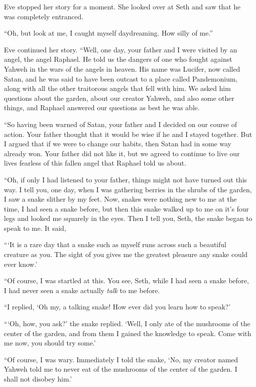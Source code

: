 \documentclass[12pt,twoside,titlepage]{report}
\begin{document}
Eve stopped her story for a moment. She looked over at Seth and saw that
he was completely entranced.

``Oh, but look at me, I caught myself daydreaming. How silly of me.''

Eve continued her story. ``Well, one day, your father and I were visited
by an angel, the angel Raphael. He told us the dangers of one who fought
against Yahweh in the wars of the angels in heaven. His name was
Lucifer, now called Satan, and he was said to have been outcast to a
place called Pandemonium, along with all the other traitorous angels
that fell with him. We asked him questions about the garden, about our
creator Yahweh, and also some other things, and Raphael answered our
questions as best he was able.

``So having been warned of Satan, your father and I decided on our
course of action. Your father thought that it would be wise if he and I
stayed together. But I argued that if we were to change our habits, then
Satan had in some way already won. Your father did not like it, but we
agreed to continue to live our lives fearless of this fallen angel that
Raphael told us about.

``Oh, if only I had listened to your father, things might not have
turned out this way. I tell you, one day, when I was gathering berries
in the shrubs of the garden, I saw a snake slither by my feet. Now,
snakes were nothing new to me at the time, I had seen a snake before,
but then this snake walked up to me on it's four legs and looked me
squarely in the eyes. Then I tell you, Seth, the snake began to speak to
me. It said,

```It is a rare day that a snake such as myself runs across such a
beautiful creature as you. The sight of you gives me the greatest
pleasure any snake could ever know.'

``Of course, I was startled at this. You see, Seth, while I had seen a
snake before, I had never seen a snake actually \emph{talk} to me
before.

``I replied, `Oh my, a talking snake! How ever did you learn how to
speak?'

```Oh, how, you ask?' the snake replied. `Well, I only ate of the
mushrooms of the center of the garden, and from them I gained the
knowledge to speak. Come with me now, you should try some.'

``Of course, I was wary. Immediately I told the snake, `No, my creator
named Yahweh told me to never eat of the mushrooms of the center of the
garden. I shall not disobey him.'
\end{document}
